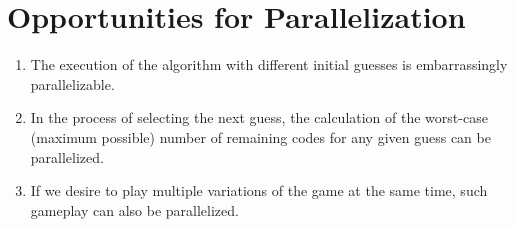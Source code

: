 \documentclass{article}
\begin{document}
\section{Opportunities for Parallelization}
\begin{enumerate}
	\item The execution of the algorithm with different initial guesses is embarrassingly parallelizable.
	\item In the process of selecting the next guess, the calculation of the worst-case (maximum possible) number of remaining codes for any given guess can be parallelized.
	\item If we desire to play multiple variations of the game at the same time, such gameplay can also be parallelized.
\end{enumerate}
\end{document}
